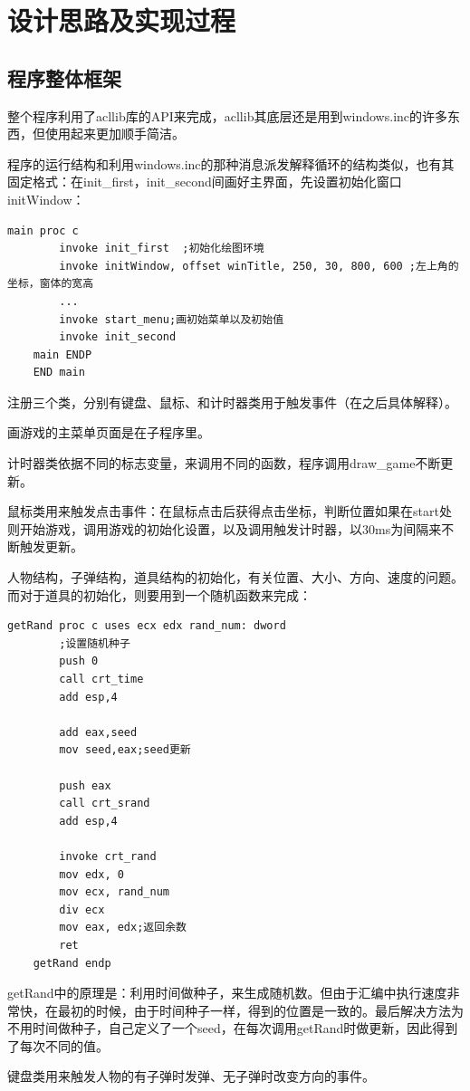 \chapter{设计思路及实现过程}
\section{程序整体框架}
整个程序利用了acllib库的API来完成，acllib其底层还是用到windows.inc的许多东西，但使用起来更加顺手简洁。
\par
程序的运行结构和利用windows.inc的那种消息派发解释循环的结构类似，也有其固定格式：在init\_first，init\_second间画好主界面，先设置初始化窗口initWindow：
\begin{lstlisting}[language={[x86masm]Assembler}]
    main proc c
        invoke init_first  ;初始化绘图环境
        invoke initWindow, offset winTitle, 250, 30, 800, 600 ;左上角的坐标，窗体的宽高
        ...
        invoke start_menu;画初始菜单以及初始值
        invoke init_second
    main ENDP
    END main
\end{lstlisting}
\par
注册三个类，分别有键盘、鼠标、和计时器类用于触发事件（在之后具体解释）。
\par
画游戏的主菜单页面是在子程序里。
\par
计时器类依据不同的标志变量，来调用不同的函数，程序调用draw\_game不断更新。
\par
鼠标类用来触发点击事件：在鼠标点击后获得点击坐标，判断位置如果在start处则开始游戏，调用游戏的初始化设置，以及调用触发计时器，以30ms为间隔来不断触发更新。
\par
人物结构，子弹结构，道具结构的初始化，有关位置、大小、方向、速度的问题。而对于道具的初始化，则要用到一个随机函数来完成：
\begin{lstlisting}[language={[x86masm]Assembler}]
    getRand proc c uses ecx edx rand_num: dword
        ;设置随机种子
        push 0
        call crt_time
        add esp,4

        add eax,seed
        mov seed,eax;seed更新
        
        push eax
        call crt_srand
        add esp,4

        invoke crt_rand
        mov edx, 0
        mov ecx, rand_num
        div ecx
        mov eax, edx;返回余数
        ret
    getRand endp
\end{lstlisting}
\par
getRand中的原理是：利用时间做种子，来生成随机数。但由于汇编中执行速度非常快，在最初的时候，由于时间种子一样，得到的位置是一致的。最后解决方法为不用时间做种子，自己定义了一个seed，在每次调用getRand时做更新，因此得到了每次不同的值。
\par
键盘类用来触发人物的有子弹时发弹、无子弹时改变方向的事件。
